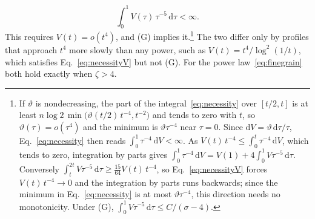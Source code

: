 \documentclass[a4paper,11pt]{article}
\newcommand{\dd}{\mathrm{d}}
\begin{document}
\begin{equation}
\label{eq:necessityV}
\int_0^1V(\tau)\,\tau^{-5}\,\dd\tau<\infty .
\end{equation}
This requires $V(t)=o(t^4)$, and (G) implies it.\footnote{If $\vartheta$ is nondecreasing, the part of the integral~\eqref{eq:necessity} over $[t/2,t]$ is at least $n\log2\,\min\bigl(\vartheta(t/2)\,t^{-4},t^{-2}\bigr)$ and tends to zero with $t$, so $\vartheta(\tau)=o(\tau^4)$ and the minimum is $\vartheta\tau^{-4}$ near $\tau=0$. Since $\dd V=\vartheta\,\dd\tau/\tau$, Eq.~\eqref{eq:necessity} then reads $\int_0^1\tau^{-4}\,\dd V<\infty$. As $V(t)\,t^{-4}\le\int_0^t\tau^{-4}\,\dd V$, which tends to zero, integration by parts gives $\int_0^1\tau^{-4}\,\dd V=V(1)+4\int_0^1V\tau^{-5}\,\dd\tau$. Conversely $\int_t^{2t}V\tau^{-5}\,\dd\tau\ge\frac{15}{64}V(t)\,t^{-4}$, so Eq.~\eqref{eq:necessityV} forces $V(t)\,t^{-4}\to0$ and the integration by parts runs backwards; since the minimum in Eq.~\eqref{eq:necessity} is at most $\vartheta\tau^{-4}$, this direction needs no monotonicity. Under (G), $\int_0^1V\tau^{-5}\,\dd\tau\le C/(\sigma-4)$.} The two differ only by profiles that approach $t^4$ more slowly than any power, such as $V(t)=t^4/\log^2(1/t)$, which satisfies Eq.~\eqref{eq:necessityV} but not (G). For the power law~\eqref{eq:finegrain} both hold exactly when $\zeta>4$.
\end{document}
